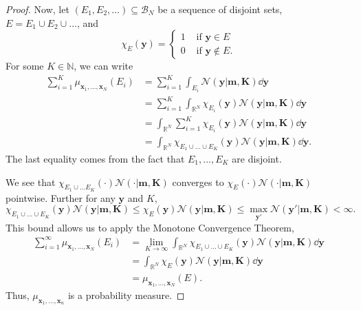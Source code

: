 \begin{proof}
    Now, let $(E_1, E_2, \dots) \subseteq \mathcal{B}_{N}$ be a sequence of disjoint sets, $E = E_1 \cup E_2 \cup \dots$, and
    \begin{equation*}
        \chi_{E}(\mathbf{y}) =
        \begin{cases}
            1 & \text{ if $\mathbf{y} \in E$} \\
            0 & \text{ if $\mathbf{y} \notin E$}.
        \end{cases}
    \end{equation*}
    For some $K \in \mathbb{N}$, we can write
    \begin{align*}
        \sum_{i = 1}^{K} \mu_{\mathbf{x}_1, \dots, \mathbf{x}_N}(E_i)
        & = \sum_{i = 1}^{K} \int_{E_i} \mathcal{N}(\mathbf{y} | \mathbf{m}, \mathbf{K}) \dd \mathbf{y} \\
        & = \sum_{i = 1}^{K} \int_{\mathbb{R}^{N}} \chi_{E_i}(\mathbf{y})\mathcal{N}(\mathbf{y} | \mathbf{m}, \mathbf{K}) \dd \mathbf{y} \\
        & =  \int_{\mathbb{R}^{N}} \sum_{i = 1}^{K}\chi_{E_i}(\mathbf{y})\mathcal{N}(\mathbf{y} | \mathbf{m}, \mathbf{K}) \dd \mathbf{y} \\
        & =  \int_{\mathbb{R}^{N}} \chi_{E_1 \cup \dots \cup E_K}(\mathbf{y})\mathcal{N}(\mathbf{y} | \mathbf{m}, \mathbf{K}) \dd \mathbf{y}.
    \end{align*}
    The last equality comes from the fact that $E_1, \dots, E_K$ are disjoint.

    We see that $\chi_{E_1 \cup \dots E_K}(\cdot)\mathcal{N}(\cdot | \mathbf{m}, \mathbf{K})$ converges to $\chi_E(\cdot) \mathcal{N}(\cdot | \mathbf{m}, \mathbf{K})$ pointwise.
    Further for any $\mathbf{y}$ and $K$,
    \begin{equation*}
        \chi_{E_1 \cup \dots \cup E_K}(\mathbf{y}) \mathcal{N}(\mathbf{y} | \mathbf{m}, \mathbf{K})
        \leq
        \chi_E(\mathbf{y}) \mathcal{N}(\mathbf{y} | \mathbf{m}, \mathbf{K})
        \leq \max_{\mathbf{y}'}\mathcal{N}(\mathbf{y'} | \mathbf{m}, \mathbf{K})
        < \infty.
    \end{equation*}
    This bound allows us to apply the Monotone Convergence Theorem,
    \begin{align*}
        \sum_{i = 1}^{\infty} \mu_{\mathbf{x}_1, \dots, \mathbf{x}_N}(E_i)
        & = \lim_{K \to \infty}\int_{\mathbb{R}^{N}} \chi_{E_1 \cup \dots \cup E_K}(\mathbf{y})\mathcal{N}(\mathbf{y} | \mathbf{m}, \mathbf{K}) \dd \mathbf{y} \\
        & = \int_{\mathbb{R}^{N}} \chi_{E}(\mathbf{y})\mathcal{N}(\mathbf{y} | \mathbf{m}, \mathbf{K}) \dd \mathbf{y} \\
        & = \mu_{\mathbf{x}_1, \dots, \mathbf{x}_N}(E).
    \end{align*}
    Thus, $\mu_{\mathbf{x}_1, \dots, \mathbf{x}_n}$ is a probability measure.


\end{proof}
